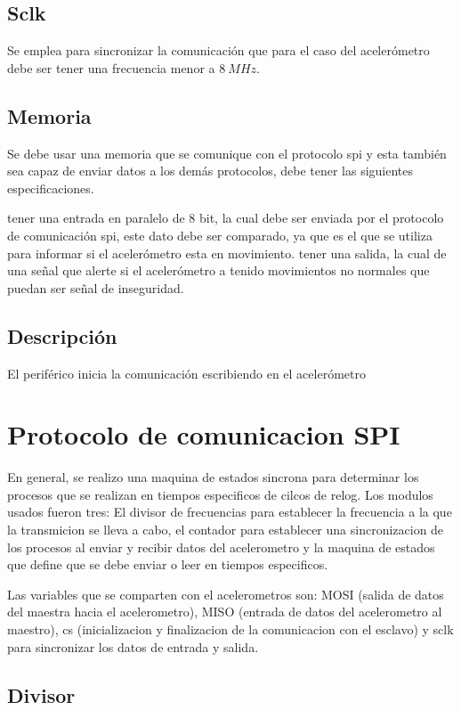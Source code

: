 \documentclass{article}
\begin{document}
\subsection{Sclk} Se emplea para sincronizar la comunicación que para el caso del acelerómetro debe ser tener una frecuencia menor a $8\ MHz$.

\subsection{Memoria} Se debe usar una memoria que se comunique con el protocolo spi y esta también sea capaz de enviar datos a los demás protocolos, debe tener las siguientes especificaciones.

tener una entrada en paralelo de 8 bit, la cual debe ser enviada por el protocolo de comunicación spi, este dato debe ser comparado, ya que es el que se utiliza para informar si el acelerómetro esta en movimiento.
tener una salida, la cual de una señal que alerte si el acelerómetro a tenido movimientos no normales que puedan ser señal de inseguridad.

\subsection{Descripción}
El periférico inicia la comunicación escribiendo en el acelerómetro 

\section{Protocolo de comunicacion SPI}

En general, se realizo una maquina de estados sincrona para determinar los procesos que se realizan en tiempos especificos de cilcos de relog. Los modulos usados fueron tres: El divisor de frecuencias para establecer la frecuencia a la que la transmicion se lleva a cabo, el contador para establecer una sincronizacion de los procesos al enviar y recibir datos del acelerometro y la maquina de estados que define que se debe enviar o leer en tiempos especificos. 

Las variables que se comparten con el acelerometros son: MOSI (salida de datos del maestra hacia el acelerometro), MISO (entrada de datos del acelerometro al maestro), cs (inicializacion y finalizacion de la comunicacion con el esclavo) y sclk para sincronizar los datos de entrada y salida.

\subsection{Divisor}
\end{document}
